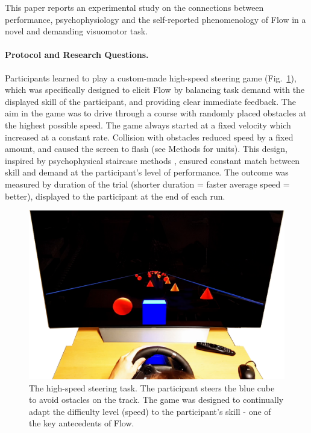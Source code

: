 \documentclass[fleqn,10pt]{wlscirep}
\begin{document}
This paper reports an experimental study on the connections between performance, psychophysiology and the self-reported phenomenology of Flow in a novel and demanding visuomotor task.


\paragraph{Protocol and Research Questions.}

Participants learned to play a custom-made high-speed steering game (Fig.~\ref{fig:cogcarsim}), which was specifically designed to elicit Flow by balancing task demand with the displayed skill of the participant, and providing clear immediate feedback. The aim in the game was to drive through a course with randomly placed obstacles at the highest possible speed. The game always started at a fixed velocity which increased at a constant rate. Collision with obstacles reduced speed by a fixed amount, and caused the screen to flash (see Methods for units).
This design, inspired by psychophysical staircase methods \cite{Cornsweet1962}, ensured constant match between skill and demand at the participant's level of performance. The outcome was measured by duration of the trial (shorter duration = faster average speed = better), displayed to the participant at the end of each run.

\begin{figure}[!ht]
	\centering
	\includegraphics[width=\linewidth]{Screenshot_cogcarsim}
	\caption{The high-speed steering task. The participant steers the blue cube to avoid ostacles on the track. The game was designed to continually adapt the difficulty level (speed) to the participant's skill - one of the key antecedents of Flow.}
	\label{fig:cogcarsim}
\end{figure}
\end{document}
